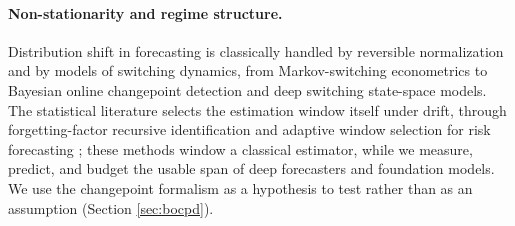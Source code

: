 \paragraph{Non-stationarity and regime structure.}
Distribution shift in forecasting is classically handled by reversible normalization \citep{revin} and by models of switching dynamics, from Markov-switching econometrics to Bayesian online changepoint detection \citep{bocpd} and deep switching state-space models. The statistical literature selects the estimation window itself under drift, through forgetting-factor recursive identification \citep{ljung1983} and adaptive window selection for risk forecasting \citep{adaptivewindow}; these methods window a classical estimator, while we measure, predict, and budget the usable span of deep forecasters and foundation models. We use the changepoint formalism as a hypothesis to test rather than as an assumption (Section \ref{sec:bocpd}).
